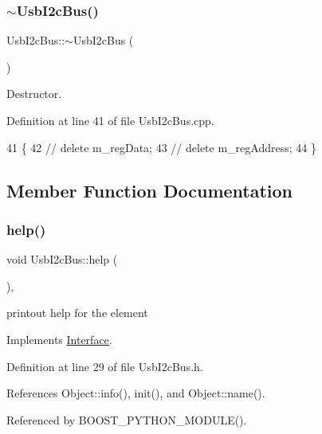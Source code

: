 \subsubsection{\texorpdfstring{$\sim$\+Usb\+I2c\+Bus()}{~UsbI2cBus()}}
{\footnotesize\ttfamily Usb\+I2c\+Bus\+::$\sim$\+Usb\+I2c\+Bus (\begin{DoxyParamCaption}{ }\end{DoxyParamCaption})\hspace{0.3cm}{\ttfamily [virtual]}}



Destructor. 



Definition at line 41 of file Usb\+I2c\+Bus.\+cpp.


\begin{DoxyCode}
41                       \{
42 \textcolor{comment}{//  delete m\_regData;}
43 \textcolor{comment}{//  delete m\_regAddress;}
44 \}
\end{DoxyCode}


\subsection{Member Function Documentation}
\mbox{\label{classUsbI2cBus_a5c3349f89fff94a8eae3d9752f5fcf6a}} 
\subsubsection{\texorpdfstring{help()}{help()}}
{\footnotesize\ttfamily void Usb\+I2c\+Bus\+::help (\begin{DoxyParamCaption}{ }\end{DoxyParamCaption})\hspace{0.3cm}{\ttfamily [inline]}, {\ttfamily [virtual]}}

printout help for the element 

Implements \hyperlink{classInterface_aedd3cf1d964c837e7848ccf81dc9c760}{Interface}.



Definition at line 29 of file Usb\+I2c\+Bus.\+h.



References Object\+::info(), init(), and Object\+::name().



Referenced by B\+O\+O\+S\+T\+\_\+\+P\+Y\+T\+H\+O\+N\+\_\+\+M\+O\+D\+U\+L\+E().


